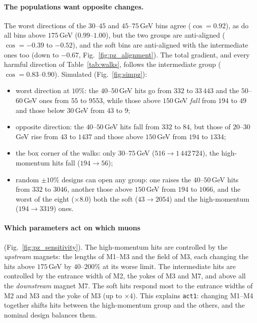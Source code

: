 \documentclass[11pt,a4paper]{article}
\begin{document}
\paragraph{The populations want opposite changes.}
The worst directions of the $30$--$45$ and $45$--$75$\,GeV bins agree ($\cos=0.92$), as do all
bins above $175$\,GeV ($0.99$--$1.00$), but the two groups are anti-aligned ($\cos=-0.39$ to
$-0.52$), and the soft bins are anti-aligned with the intermediate ones too (down to $-0.67$,
Fig.~\ref{fig:pz_alignment}). The total gradient, and every harmful direction of
Table~\ref{tab:walks}, follows the intermediate group ($\cos=0.83$--$0.90$). Simulated
(Fig.~\ref{fig:simpz}):
\begin{itemize}
  \item worst direction at $10\%$: the $40$--$50$\,GeV hits go from $332$ to $33\,443$ and the
        $50$--$60$\,GeV ones from $55$ to $9553$, while those above $150$\,GeV \emph{fall} from
        $194$ to $49$ and those below $30$\,GeV from $43$ to $9$;
  \item opposite direction: the $40$--$50$\,GeV hits fall from $332$ to $84$, but those of
        $20$--$30$\,GeV rise from $43$ to $1437$ and those above $150$\,GeV from $194$ to $1334$;
  \item the box corner of the walks: only $30$--$75$\,GeV ($516\to1\,442\,724$), the
        high-momentum hits fall ($194\to56$);
  \item random $\pm10\%$ designs can open any group: one raises the $40$--$50$\,GeV hits from $332$
        to $3046$, another those above $150$\,GeV from $194$ to $1066$, and the worst of the eight
        ($\times8.0$) both the soft ($43\to2054$) and the high-momentum ($194\to3319$) ones.
\end{itemize}

\paragraph{Which parameters act on which muons} (Fig.~\ref{fig:pz_sensitivity}).
The high-momentum hits are controlled by the \emph{upstream} magnets: the lengths of M1--M3 and
the field of M3, each changing the hits above $175$\,GeV by $40$--$200\%$ at its worse limit. The
intermediate hits are controlled by the entrance width of M2, the yokes of M3 and M7, and above
all the \emph{downstream} magnet M7. The soft hits respond most to the entrance widths of M2 and
M3 and the yoke of M3 (up to $\times4$). This explains \texttt{act1}: changing M1--M4 together shifts
hits between the high-momentum group and the others, and the nominal design balances them.
\end{document}
